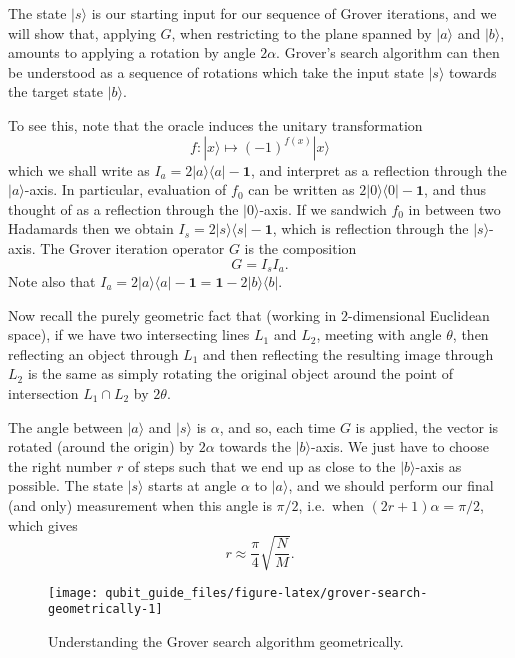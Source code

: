 \documentclass[fleqn]{article}
\begin{document}
The state \(|s\rangle\) is our starting input for our sequence of Grover iterations, and we will show that, applying \(G\), when restricting to the plane spanned by \(|a\rangle\) and \(|b\rangle\), amounts to applying a rotation by angle \(2\alpha\).
Grover's search algorithm can then be understood as a sequence of rotations which take the input state \(|s\rangle\) towards the target state \(|b\rangle\).

To see this, note that the oracle induces the unitary transformation
\[
  f\colon |x\rangle \mapsto (-1)^{f(x)}|x\rangle
\]
which we shall write as \(I_a = 2|a\rangle\langle a|-\mathbf{1}\), and interpret as a reflection through the \(|a\rangle\)-axis.
In particular, evaluation of \(f_0\) can be written as \(2|0\rangle\langle 0|-\mathbf{1}\), and thus thought of as a reflection through the \(|0\rangle\)-axis.
If we sandwich \(f_0\) in between two Hadamards then we obtain \(I_s = 2|s\rangle\langle s|-\mathbf{1}\), which is reflection through the \(|s\rangle\)-axis.
The Grover iteration operator \(G\) is the composition
\[
  G = I_s I_a.
\]
Note also that \(I_a = 2|a\rangle\langle a|-\mathbf{1}= \mathbf{1}-2|b\rangle\langle b|\).

Now recall the purely geometric fact that (working in \(2\)-dimensional Euclidean space), if we have two intersecting lines \(L_1\) and \(L_2\), meeting with angle \(\theta\), then reflecting an object through \(L_1\) and then reflecting the resulting image through \(L_2\) is the same as simply rotating the original object around the point of intersection \(L_1\cap L_2\) by \(2\theta\).

The angle between \(|a\rangle\) and \(|s\rangle\) is \(\alpha\), and so, each time \(G\) is applied, the vector is rotated (around the origin) by \(2\alpha\) towards the \(|b\rangle\)-axis.
We just have to choose the right number \(r\) of steps such that we end up as close to the \(|b\rangle\)-axis as possible.
The state \(|s\rangle\) starts at angle \(\alpha\) to \(|a\rangle\), and we should perform our final (and only) measurement when this angle is \(\pi/2\), i.e.~when \((2r+1)\alpha = \pi/2\), which gives
\[
  r \approx \frac{\pi}{4}\sqrt{\frac{N}{M}}.
\]

\begin{figure}[H]

{\centering \texttt{[image: qubit\_guide\_files/figure-latex/grover-search-geometrically-1]} 

}

\caption{Understanding the Grover search algorithm geometrically.}\label{fig:grover-search-geometrically}
\end{figure}
\end{document}
